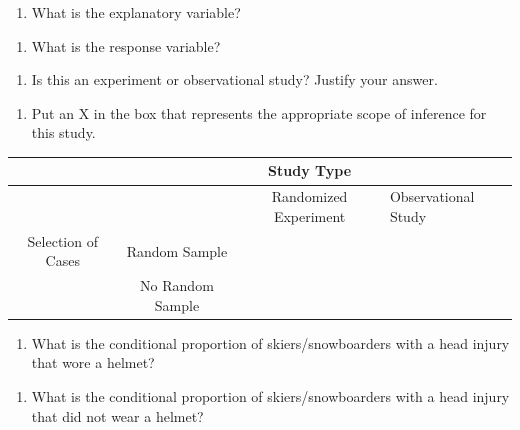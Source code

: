 \documentclass[
]{report}
\providecommand{\tightlist}{%
  \setlength{\itemsep}{0pt}\setlength{\parskip}{0pt}}
\begin{document}
\begin{enumerate}
\def\labelenumi{\arabic{enumi}.}
\tightlist
\item
  What is the explanatory variable?
\end{enumerate}

\vspace{0.4in}

\begin{enumerate}
\def\labelenumi{\arabic{enumi}.}
\setcounter{enumi}{1}
\tightlist
\item
  What is the response variable?
\end{enumerate}

\vspace{0.4in}

\begin{enumerate}
\def\labelenumi{\arabic{enumi}.}
\setcounter{enumi}{2}
\tightlist
\item
  Is this an experiment or observational study? Justify your answer.
\end{enumerate}

\vspace{0.4in}

\begin{enumerate}
\def\labelenumi{\arabic{enumi}.}
\setcounter{enumi}{3}
\tightlist
\item
  Put an X in the box that represents the appropriate scope of inference for this study.
\end{enumerate}

\begin{longtable}[]{@{}cccl@{}}
\toprule
& & Study Type &\tabularnewline
\midrule
\endhead
& & Randomized Experiment & Observational Study\tabularnewline
Selection of Cases & Random Sample & &\tabularnewline
& No Random Sample & &\tabularnewline
\bottomrule
\end{longtable}

\begin{enumerate}
\def\labelenumi{\arabic{enumi}.}
\setcounter{enumi}{4}
\tightlist
\item
  What is the conditional proportion of skiers/snowboarders with a head injury that wore a helmet?
\end{enumerate}

\vspace{.6in}

\begin{enumerate}
\def\labelenumi{\arabic{enumi}.}
\setcounter{enumi}{5}
\tightlist
\item
  What is the conditional proportion of skiers/snowboarders with a head injury that did not wear a helmet?
\end{enumerate}
\end{document}
